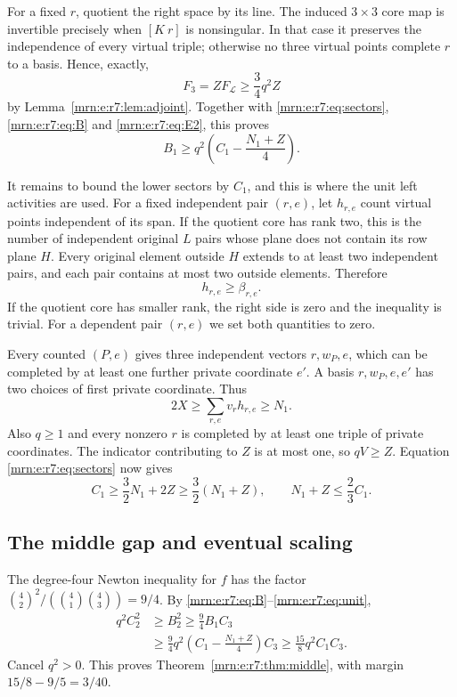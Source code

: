 \documentclass[11pt,a4paper]{article}
\theoremstyle{remark}\newtheorem{remark}[theorem]{Remark}
\begin{document}
For a fixed $r$, quotient the right space by its line. The induced $3\times3$ core map is invertible precisely when $[K\ r]$ is nonsingular. In that case it preserves the independence of every virtual triple; otherwise no three virtual points complete $r$ to a basis. Hence, exactly,
\[
 F_3=ZF_{\mathcal L}\ge\frac34q^2Z
\]
by Lemma~\ref{mrn:e:r7:lem:adjoint}. Together with \eqref{mrn:e:r7:eq:sectors}, \eqref{mrn:e:r7:eq:B} and \eqref{mrn:e:r7:eq:E2}, this proves
\begin{equation}\label{mrn:e:r7:eq:lowerB}
 B_1\ge q^2\left(C_1-\frac{N_1+Z}{4}\right).
\end{equation}

It remains to bound the lower sectors by $C_1$, and this is where the unit left activities are used. For a fixed independent pair $(r,e)$, let $h_{r,e}$ count virtual points independent of its span. If the quotient core has rank two, this is the number of independent original $L$ pairs whose plane does not contain its row plane $H$. Every original element outside $H$ extends to at least two independent pairs, and each pair contains at most two outside elements. Therefore
\[
 h_{r,e}\ge\beta_{r,e}.
\]
If the quotient core has smaller rank, the right side is zero and the inequality is trivial. For a dependent pair $(r,e)$ we set both quantities to zero.

Every counted $(P,e)$ gives three independent vectors $r,w_P,e$, which can be completed by at least one further private coordinate $e'$. A basis $r,w_P,e,e'$ has two choices of first private coordinate. Thus
\begin{equation}\label{mrn:e:r7:eq:X}
 2X\ge\sum_{r,e}v_rh_{r,e}\ge N_1.
\end{equation}
Also $q\ge1$ and every nonzero $r$ is completed by at least one triple of private coordinates. The indicator contributing to $Z$ is at most one, so $qV\ge Z$. Equation \eqref{mrn:e:r7:eq:sectors} now gives
\begin{equation}\label{mrn:e:r7:eq:unit}
 C_1\ge\frac32N_1+2Z\ge\frac32(N_1+Z),
 \qquad N_1+Z\le\frac23C_1.
\end{equation}

\subsection{The middle gap and eventual scaling}
The degree-four Newton inequality for $f$ has the factor $\binom42^2/(\binom41\binom43)=9/4$. By \eqref{mrn:e:r7:eq:B}--\eqref{mrn:e:r7:eq:unit},
\begin{align*}
 q^2C_2^2&\ge B_2^2\ge\frac94 B_1C_3\\
 &\ge\frac94q^2\left(C_1-\frac{N_1+Z}{4}\right)C_3
 \ge\frac{15}{8}q^2C_1C_3.
\end{align*}
Cancel $q^2>0$. This proves Theorem~\ref{mrn:e:r7:thm:middle}, with margin $15/8-9/5=3/40$.
\end{document}

